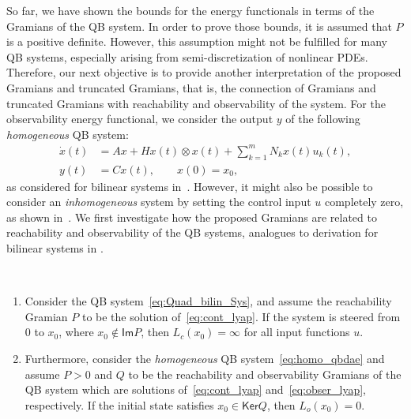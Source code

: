 
So far, we have shown the bounds for the energy functionals in terms of the Gramians of the QB system. In order to prove those bounds, it is assumed that $P$ is a  positive definite. However, this assumption might not be fulfilled for many QB systems, especially arising from  semi-discretization of nonlinear PDEs. Therefore, our next objective is to  provide another interpretation of the proposed Gramians and truncated Gramians, that is, the connection of Gramians and truncated Gramians with reachability and observability of the system. 
 For the observability energy functional, we consider the output $y$ of the following \emph{homogeneous}  QB system:
\begin{equation}\label{eq:homo_qbdae}
\begin{aligned}
\dot{x}(t)&= Ax + Hx(t)\otimes x(t) + \sum_{k=1}^mN_kx(t)u_k(t),\\
y(t) &= Cx(t),\qquad x(0) = x_0,
\end{aligned}
\end{equation}
as considered for bilinear systems in~\cite{morBenD11,enefungray98}. However, it might also be possible to consider an \emph{inhomogeneous} system by setting the control input $u$ completely zero, as shown in~\cite{morSch93}. We first investigate how the proposed Gramians are related to reachability and observability of the QB systems, analogues to derivation for bilinear systems  in \cite{morBenD11}.
\def\im {\ensuremath{{\mathsf{Im}}}}
\def\ker {\ensuremath{{\mathsf{Ker}}}}
\def\rank {\ensuremath{{\mathsf{rank}}}}
\begin{theorem}\label{thm:kerPQ_dyn}
	\
	\begin{enumerate}[label=(\alph*)]
		\item Consider the QB system~\eqref{eq:Quad_bilin_Sys}, and assume the reachability Gramian $P$ to be the solution of~\eqref{eq:cont_lyap}. If the system is steered from $0$ to $x_0$, where $x_0 \not\in \im P$, then $L_c(x_0) = \infty$ for all input functions $u$.
		\item Furthermore,  consider the \emph{homogeneous} QB system~\eqref{eq:homo_qbdae} and assume $P>0$ and $Q$ to be the reachability and observability Gramians of the QB system which are  solutions of~\eqref{eq:cont_lyap} and~\eqref{eq:obser_lyap}, respectively. If the initial state satisfies $x_0 \in  \ker Q$, then $L_o(x_0) = 0$.
	\end{enumerate}
\end{theorem}
